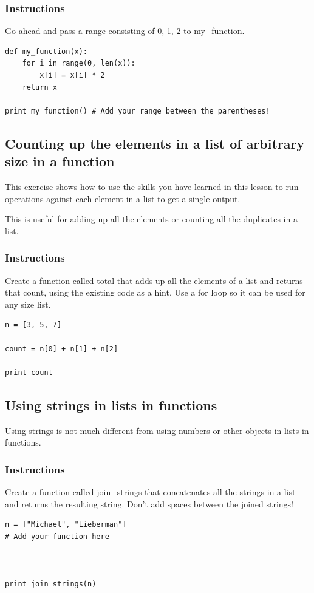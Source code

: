 \documentclass[12pt,a4paper,final,twoside,onecolumn,titlepage]{book}
\begin{document}
\subsubsection{Instructions}

Go ahead and pass a range consisting of 0, 1, 2 to my\_function.
\begin{lstlisting}
def my_function(x):
    for i in range(0, len(x)):
        x[i] = x[i] * 2
    return x

print my_function() # Add your range between the parentheses!
\end{lstlisting}

\subsection{Counting up the elements in a list of arbitrary size in a function}

This exercise shows how to use the skills you have learned in this lesson to run operations against each element in a list to get a single output.

This is useful for adding up all the elements or counting all the duplicates in a list.
\subsubsection{Instructions}

Create a function called total that adds up all the elements of a list and returns that count, using the existing code as a hint. Use a for loop so it can be used for any size list.
\begin{lstlisting}
n = [3, 5, 7]

count = n[0] + n[1] + n[2]

print count
\end{lstlisting}

\subsection{Using strings in lists in functions}

Using strings is not much different from using numbers or other objects in lists in functions.
\subsubsection{Instructions}

Create a function called join\_strings that concatenates all the strings in a list and returns the resulting string. Don't add spaces between the joined strings!
\begin{lstlisting}
n = ["Michael", "Lieberman"]
# Add your function here



print join_strings(n)
\end{lstlisting}
\end{document}
